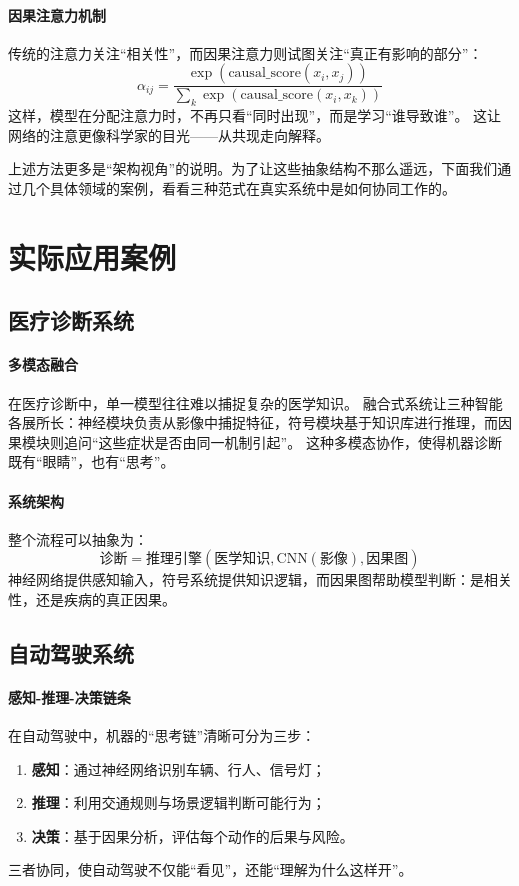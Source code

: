 \paragraph{因果注意力机制}
传统的注意力关注“相关性”，而因果注意力则试图关注“真正有影响的部分”：  
$$\alpha_{ij} = \frac{\exp(\text{causal\_score}(x_i, x_j))}{\sum_{k} \exp(\text{causal\_score}(x_i, x_k))}$$
这样，模型在分配注意力时，不再只看“同时出现”，而是学习“谁导致谁”。  
这让网络的注意更像科学家的目光——从共现走向解释。

上述方法更多是“架构视角”的说明。为了让这些抽象结构不那么遥远，下面我们通过几个具体领域的案例，看看三种范式在真实系统中是如何协同工作的。

\section{实际应用案例}

\subsection{医疗诊断系统}

\paragraph{多模态融合}
在医疗诊断中，单一模型往往难以捕捉复杂的医学知识。  
融合式系统让三种智能各展所长：神经模块负责从影像中捕捉特征，符号模块基于知识库进行推理，而因果模块则追问“这些症状是否由同一机制引起”。  
这种多模态协作，使得机器诊断既有“眼睛”，也有“思考”。

\paragraph{系统架构}
整个流程可以抽象为：  
$$\text{诊断} = \text{推理引擎}(\text{医学知识}, \text{CNN}(\text{影像}), \text{因果图})$$
神经网络提供感知输入，符号系统提供知识逻辑，而因果图帮助模型判断：是相关性，还是疾病的真正因果。

\subsection{自动驾驶系统}

\paragraph{感知-推理-决策链条}
在自动驾驶中，机器的“思考链”清晰可分为三步：  
\begin{enumerate}
\item \textbf{感知}：通过神经网络识别车辆、行人、信号灯；  
\item \textbf{推理}：利用交通规则与场景逻辑判断可能行为；  
\item \textbf{决策}：基于因果分析，评估每个动作的后果与风险。  
\end{enumerate}
三者协同，使自动驾驶不仅能“看见”，还能“理解为什么这样开”。

